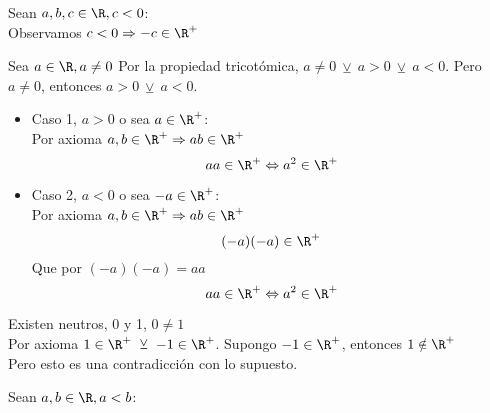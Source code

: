 \documentclass[10pt]{article}
\begin{document}
\begin{prf}{}
	Sean $a,b,c \in \R, c<0$:\\
	Observamos $c<0 \Rightarrow -c \in \R^+$\\

\end{prf}

\begin{prf}{}
	Sea $a \in \R, a \neq 0$
	Por la propiedad tricotómica, $a \neq 0\ \veebar\ a > 0\ \veebar\ a < 0$.
	Pero $a \neq 0$, entonces $a > 0\ \veebar\ a < 0$.\\

	\begin{itemize}
		\item Caso 1, $a > 0$ o sea $a \in \R^+$:\\
		Por axioma $a,b \in \R^+ \Rightarrow ab \in \R^+$
		$$aa \in \R^+ \Leftrightarrow a^2 \in \R^+$$
		\item Caso 2, $a < 0$ o sea $-a \in \R^+$:\\
		Por axioma $a,b \in \R^+ \Rightarrow ab \in \R^+$
		$$(-a)(-a) \in \R^+$$
		Que por $(-a)(-a) = aa$
		$$aa \in \R^+ \Leftrightarrow a^2 \in \R^+$$
	\end{itemize}
\end{prf}

\begin{prf}[$1 \in \R^+$]{}
	Existen neutros, 0 y 1, $0 \neq 1$\\
	Por axioma $1 \in \R^+\ \veebar\ -1 \in \R^+$.
	Supongo $-1 \in \R^+$, entonces $1 \notin \R^+$\\
	\lreqn{1 \in \R^+}{}
	Pero esto es una contradicción con lo supuesto.
\end{prf}

\begin{prf}[$a < b \Leftarrow -b < -a$]{}
	Sean $a,b \in \R, a < b$:\\

\end{prf}
\end{document}
